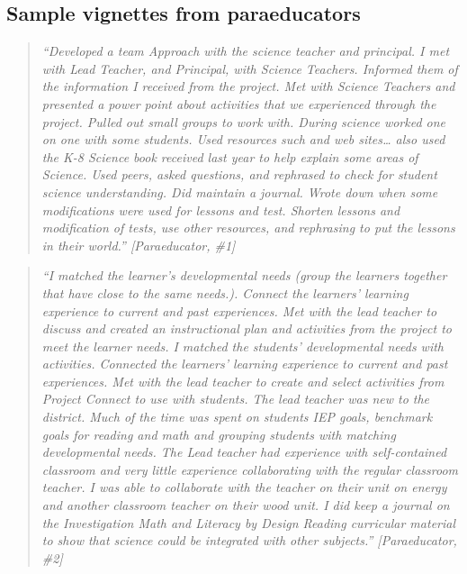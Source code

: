 \documentclass[11.5pt]{sig-alternate} %
\begin{document}
\begin{large}
\subsection*{Sample vignettes from paraeducators}

\begin{quote}
    \textit{“Developed a team Approach with the science teacher and principal. I met with Lead Teacher, and Principal, with Science Teachers. Informed them of the information I received from the project. Met with Science Teachers and presented a power point about activities that we experienced through the project. Pulled out small groups to work with. During science worked one on one with some students. Used resources such and web sites… also used the K-8 Science book received last year to help explain some areas of Science. Used peers, asked questions, and rephrased to check for student science understanding. Did maintain a journal. Wrote down when some modifications were used for lessons and test. Shorten lessons and modification of tests, use other resources, and rephrasing to put the lessons in their world.” [Paraeducator, \#1]}
\end{quote}

\begin{quote}
    \textit{“I matched the learner’s developmental needs (group the learners together that have close to the same needs.). Connect the learners’ learning experience to current and past experiences. Met with the lead teacher to discuss and created an instructional plan and activities from the project to meet the learner needs. I matched the students’ developmental needs with activities. Connected the learners’ learning experience to current and past experiences. Met with the lead teacher to create and select activities from Project Connect to use with students.  The lead teacher was new to the district. Much of the time was spent on students IEP goals, benchmark goals for reading and math and grouping students with matching developmental needs. The Lead teacher had experience with self-contained classroom and very little experience collaborating with the regular classroom teacher. I was able to collaborate with the teacher on their unit on energy and another classroom teacher on their wood unit. I did keep a journal on the Investigation Math and Literacy by Design Reading curricular material to show that science could be integrated with other subjects.” [Paraeducator, \#2]}
\end{quote}


\end{large}
\end{document}
